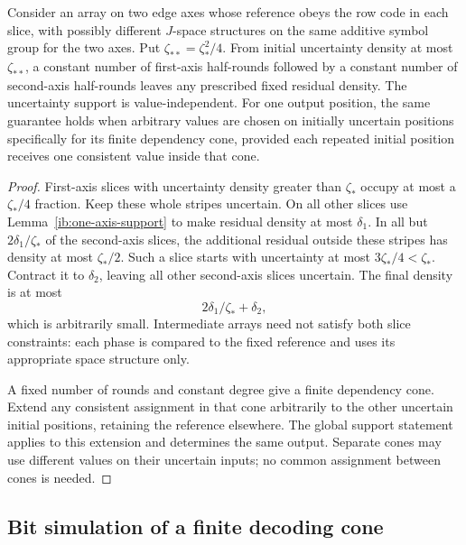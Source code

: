 \begin{lemma}
\label{ib:two-axis-support}
Consider an array on two edge axes whose reference obeys the row
code in each slice, with possibly different \(J\)-space structures
on the same additive symbol group for the two axes.  Put
\(\zeta_{**}=\zeta_*^2/4\).  From initial uncertainty density at
most \(\zeta_{**}\), a constant number of first-axis half-rounds
followed by a constant number of second-axis half-rounds leaves any
prescribed fixed residual density.  The uncertainty support is
value-independent.  For one output position, the same guarantee
holds when arbitrary values are chosen on initially uncertain
positions specifically for its finite dependency cone, provided
each repeated initial position receives one consistent value inside
that cone.
\end{lemma}

\begin{proof}
First-axis slices with uncertainty density greater than
\(\zeta_*\) occupy at most a \(\zeta_*/4\) fraction.  Keep these
whole stripes uncertain.  On all other slices use
Lemma~\ref{ib:one-axis-support} to make residual density at most
\(\delta_1\).  In all but \(2\delta_1/\zeta_*\) of the
second-axis slices, the additional residual outside these stripes
has density at most \(\zeta_*/2\).  Such a slice starts with
uncertainty at most \(3\zeta_*/4<\zeta_*\).  Contract it to
\(\delta_2\), leaving all other second-axis slices uncertain.
The final density is at most
\[
 2\delta_1/\zeta_*+\delta_2,
\]
which is arbitrarily small.  Intermediate arrays need not satisfy
both slice constraints: each phase is compared to the fixed
reference and uses its appropriate space structure only.

A fixed number of rounds and constant degree give a finite
dependency cone.  Extend any consistent assignment in that cone
arbitrarily to the other uncertain initial positions, retaining the
reference elsewhere.  The global support statement applies to this
extension and determines the same output.  Separate cones may use
different values on their uncertain inputs; no common assignment
between cones is needed.
\end{proof}

\subsection{Bit simulation of a finite decoding cone}
\label{ib:cone-simulation}

